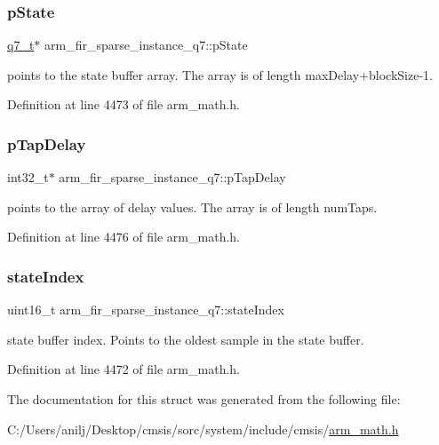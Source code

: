 \subsubsection{\texorpdfstring{p\+State}{pState}}
{\footnotesize\ttfamily \hyperlink{arm__math_8h_ae541b6f232c305361e9b416fc9eed263}{q7\+\_\+t}$\ast$ arm\+\_\+fir\+\_\+sparse\+\_\+instance\+\_\+q7\+::p\+State}

points to the state buffer array. The array is of length max\+Delay+block\+Size-\/1. 

Definition at line 4473 of file arm\+\_\+math.\+h.

\mbox{\label{structarm__fir__sparse__instance__q7_ac625393c84bc0342ffdf26fc4eba1ac1}} 
\subsubsection{\texorpdfstring{p\+Tap\+Delay}{pTapDelay}}
{\footnotesize\ttfamily int32\+\_\+t$\ast$ arm\+\_\+fir\+\_\+sparse\+\_\+instance\+\_\+q7\+::p\+Tap\+Delay}

points to the array of delay values. The array is of length num\+Taps. 

Definition at line 4476 of file arm\+\_\+math.\+h.

\mbox{\label{structarm__fir__sparse__instance__q7_a2d2e65473fe3a3f2b953b4e0b60824df}} 
\subsubsection{\texorpdfstring{state\+Index}{stateIndex}}
{\footnotesize\ttfamily uint16\+\_\+t arm\+\_\+fir\+\_\+sparse\+\_\+instance\+\_\+q7\+::state\+Index}

state buffer index. Points to the oldest sample in the state buffer. 

Definition at line 4472 of file arm\+\_\+math.\+h.



The documentation for this struct was generated from the following file\+:\begin{DoxyCompactItemize}
\item 
C\+:/\+Users/anilj/\+Desktop/cmsis/sorc/system/include/cmsis/\hyperlink{arm__math_8h}{arm\+\_\+math.\+h}\end{DoxyCompactItemize}
